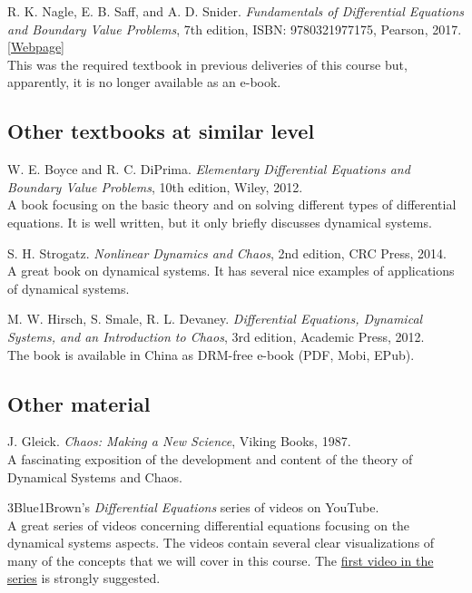 \documentclass[11pt]{article}
\newcommand{\push}{\hangpara{2em}{1}}
\begin{document}
\push R. K. Nagle, E. B. Saff, and A. D. Snider. \textit{Fundamentals of Differential Equations and Boundary Value Problems}, 7th edition, ISBN: 9780321977175, Pearson, 2017. 
\href{https://www.pearson.com/store/p/fundamentals-of-differential-equations-and-boundary-value-problems/P100002446580}{[Webpage]} \\
This was the required textbook in previous deliveries of this course but, apparently, it is no longer available as an e-book.

\subsection{Other textbooks at similar level}

\push W. E. Boyce and R. C. DiPrima. \textit{Elementary Differential Equations and Boundary Value Problems}, 10th edition, Wiley, 2012. \\
A book focusing on the basic theory and on solving different types of differential equations. It is well written, but it only briefly discusses dynamical systems. 

\push S. H. Strogatz. \textit{Nonlinear Dynamics and Chaos}, 2nd edition, CRC Press, 2014. \\
A great book on dynamical systems. It has several nice examples of applications of dynamical systems.

\push M. W. Hirsch, S. Smale, R. L. Devaney. \textit{Differential Equations, Dynamical Systems, and an Introduction to Chaos}, 3rd edition, Academic Press, 2012. \\
The book is available in China as DRM-free e-book (PDF, Mobi, EPub). 

\subsection{Other material}

\push J. Gleick. \textit{Chaos: Making a New Science}, Viking Books, 1987. \\
A fascinating exposition of the development and content of the theory of Dynamical Systems and Chaos.

\push 3Blue1Brown's \textit{Differential Equations} series of videos on YouTube. \\
A great series of videos concerning differential equations focusing on the dynamical systems aspects. The videos contain several clear visualizations of many of the concepts that we will cover in this course. The \href{https://www.youtube.com/watch?v=p_di4Zn4wz4}{first video in the series} is strongly suggested.
\end{document}
